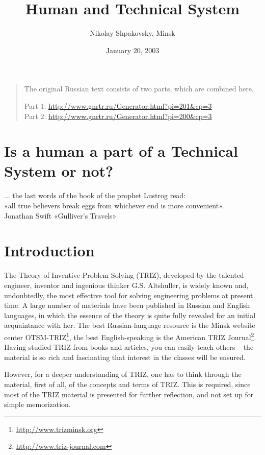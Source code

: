 \documentclass[11pt,a4paper]{article}
\title{Human and Technical System}
\author{Nikolay Shpakovsky, Minsk}
\date{January 20, 2003}
\begin{document}
\maketitle

\begin{quote}
  The original Russian text consists of two parts, which are combined here.
  
  Part 1: \url{http://www.gnrtr.ru/Generator.html?pi=201&cp=3}\\
  Part 2: \url{http://www.gnrtr.ru/Generator.html?pi=200&cp=3}
\end{quote}

\section*{Is a human a part of a Technical System or not?}
\begin{flushright}
  ... the last words of the book of the prophet Lustrog read:\\ «all true
  believers break eggs from whichever end is more convenient».\\
  Jonathan Swift «Gulliver's Travels»
\end{flushright}

\section*{Introduction}
The Theory of Inventive Problem Solving (TRIZ), developed by the talented
engineer, inventor and ingenious thinker G.S. Altshuller, is widely known and,
undoubtedly, the most effective tool for solving engineering problems at
present time. A large number of materials have been published in Russian and
English languages, in which the essence of the theory is quite fully revealed
for an initial acquaintance with her. The best Russian-language resource is
the Minsk website center OTSM-TRIZ\footnote{\url{http://www.trizminsk.org}},
the best English-speaking is the American TRIZ
Journal\footnote{\url{http://www.triz-journal.com}}. Having studied TRIZ from
books and articles, you can easily teach others -- the material is so rich and
fascinating that interest in the classes will be ensured.

However, for a deeper understanding of TRIZ, one has to think through the
material, first of all, of the concepts and terms of TRIZ. This is required,
since most of the TRIZ material is presented for further reflection, and not
set up for simple memorization.
\end{document}
